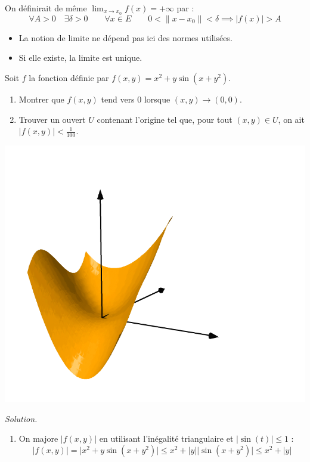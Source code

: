 \documentclass[11pt, class=report,crop=false]{standalone}
\begin{document}
On définirait de même $\lim_{x \to x_0} f(x) = +\infty$ par :
$$\forall A >0 \quad \exists \delta > 0 \qquad
\forall x\in E  \qquad 
0< \| x-x_0 \| <\delta \implies | f(x) | > A
$$

\begin{remarque*}
\sauteligne
\begin{itemize}
\item La notion de limite ne dépend pas ici des normes utilisées.
\item Si elle existe, la limite est unique.
\end{itemize}
\end{remarque*}


\begin{exemple}
\label{ex:plusvarex}
Soit $f$ la fonction définie par $f(x,y) = x^2+y\sin(x+y^2)$.
\begin{enumerate}
  \item Montrer que $f(x,y)$ tend vers $0$ lorsque $(x,y) \to (0,0)$. 
  \item Trouver un ouvert $U$ contenant l'origine tel que, pour tout $(x,y) \in U$, on ait $| f(x,y) | < \frac{1}{100}$.
\end{enumerate}
  
\begin{center}
  \includegraphics[scale=0.4]{figures/fig-plusvar-31-01}
\end{center}
 

\bigskip
\emph{Solution.}

\begin{enumerate}
  \item On majore $|f(x,y)|$ en utilisant l'inégalité triangulaire et $|\sin(t)| \le 1$ :
  $$\big| f(x,y) \big|  = \big| x^2+y\sin(x+y^2) \big| \le
  x^2 + |y| \big| \sin(x+y^2) \big| \le x^2 +|y|$$ 
  

\end{enumerate}
\end{exemple}
\end{document}
